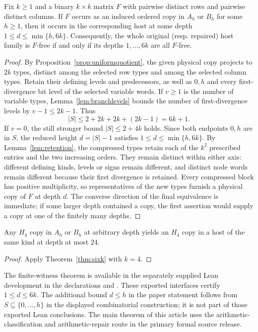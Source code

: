 \begin{theorem}
\label{thm:sixk}
Fix $k\ge1$ and a binary $k\times k$ matrix $F$ with pairwise
distinct rows and pairwise distinct columns. If $F$ occurs as an
induced ordered copy in $A_h$ or $B_h$ for some $h\ge1$, then it
occurs in the corresponding host at some depth
$1\le d\le\min\{h,6k\}$. Consequently, the whole original
(resp. repaired) host family is $F$-free if and only if its depths
$1,\dots,6k$ are all $F$-free.
\end{theorem}
\begin{proof}
By Proposition~\ref{prop:uniformquotient}, the given physical copy
projects to $2k$ types, distinct among the selected row types and
among the selected column types. Retain their defining levels and
predecessors, as well as $0,h$ and every first-divergence bit level
of the selected variable words. If $v\ge1$ is the number of
variable types, Lemma~\ref{lem:branchlevels} bounds the number of
first-divergence levels by $v-1\le2k-1$. Thus
\[
 |S|\le 2+2k+2k+(2k-1)=6k+1.
\]
If $v=0$, the still stronger bound $|S|\le2+4k$ holds. Since both
endpoints $0,h$ are in $S$, the reduced height
$d=|S|-1$ satisfies $1\le d\le\min\{h,6k\}$.
By Lemma~\ref{lem:retention}, the compressed types retain each
of the $k^2$ prescribed entries and the two increasing orders.
They remain distinct within either axis: different defining kinds,
levels or signs remain different, and distinct node words remain
different because their first divergence is retained. Every
compressed block has positive multiplicity, so representatives of
the new types furnish a physical copy of $F$ at depth $d$.
The converse direction of the final equivalence is immediate;
if some larger depth contained a copy, the first assertion would
supply a copy at one of the finitely many depths.
\end{proof}

\begin{corollary}
\label{cor:twentyfour}
Any $H_4$ copy in $A_h$ or $B_h$ at arbitrary depth yields an
$H_4$ copy in a host of the same kind at depth at most $24$.
\end{corollary}
\begin{proof}
Apply Theorem~\ref{thm:sixk} with $k=4$.
\end{proof}

\begin{remark}
The finite-witness theorem is available in the separately supplied
Lean development in the declarations
and . These exported
interfaces certify $1\le d\le6k$. The additional bound $d\le h$
in the paper statement follows from $S\subseteq\{0,\dots,h\}$ in
the displayed combinatorial construction; it is not part of those
exported Lean conclusions.
The main theorem of this article uses the arithmetic-classification
and arithmetic-repair route in the primary formal source release.
\end{remark}

